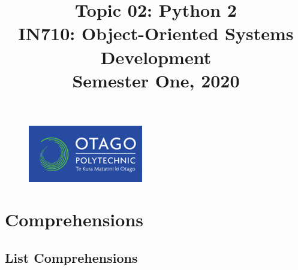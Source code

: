 \documentclass{article}
\author{}
\begin{document}
\begin{figure}
  \includegraphics[width=50mm]{../../../resources/img/logo.png}
\end{figure}

\title{Topic 02: Python 2\\IN710: Object-Oriented Systems Development\\Semester One, 2020}
\date{}
\maketitle

\section*{Comprehensions}

\subsection*{List Comprehensions}
\end{document}
